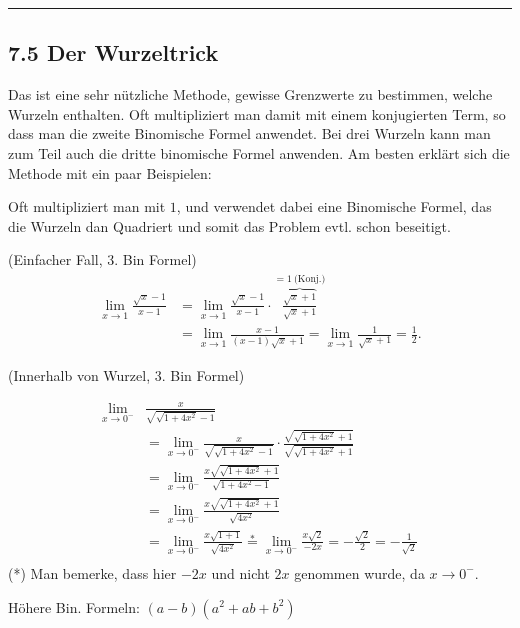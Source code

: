\documentclass[a4paper,landscape,8pt]{extarticle}
\newcommand{\sep}{\vspace{5pt}\noindent\hrule\vspace{5pt}}
\begin{document}
\begin{multicols*}{4}
\sep

\subsection{7.5 Der Wurzeltrick}

Das ist eine sehr nützliche Methode, gewisse Grenzwerte zu bestimmen, welche
Wurzeln enthalten. Oft multipliziert man damit mit einem konjugierten Term, so
dass man die zweite Binomische Formel anwendet. Bei drei Wurzeln kann man zum
Teil auch die dritte binomische Formel anwenden. Am besten erklärt sich die
Methode mit ein paar Beispielen:

\Vorgehen Oft multipliziert man mit $1$, und verwendet dabei eine Binomische
Formel, das die Wurzeln dan Quadriert und somit das Problem evtl. schon
beseitigt.

\begin{warmup}
\Bsp (Einfacher Fall, 3. Bin Formel)
\begin{align*}
\lim_{x\to 1}\frac{\sqrt{x}-1}{x-1} 
& =\lim_{x\to 1}\frac{\sqrt{x}-1}{x-1} \cdot
\overbrace{\frac{\sqrt{x}+1}{\sqrt{x}+1}}^{=1 \ \text{(Konj.)}}\\
&=\lim_{x\to 1}\frac{x-1}{(x-1)\sqrt{x}+1}=\lim_{x\to 1}\frac{1}{\sqrt{x}+1} =
\frac{1}{2}.
\end{align*}

\Bsp (Innerhalb von Wurzel, 3. Bin Formel)

\begin{align*}
\lim_{x\to 0^-} &\frac{x}{\sqrt{\sqrt{1+4x^2}-1}}\\
&= \lim_{x\to 0^-} \frac{x}{\sqrt{\sqrt{1+4x^2}-1}} \cdot
    \frac{\sqrt{\sqrt{1+4x^2}+1}}{\sqrt{\sqrt{1+4x^2}+1}}\\
&= \lim_{x\to 0^-} \frac{x\sqrt{\sqrt{1+4x^2}+1}}{\sqrt{1+4x^2-1}}\\
&= \lim_{x\to 0^-} \frac{x\sqrt{\sqrt{1+4x^2}+1}}{\sqrt{4x^2}}\\
&= \lim_{x\to 0^-} \frac{x\sqrt{1+1}}{\sqrt{4x^2}}
\stackrel{*}{=} \lim_{x\to 0^-} \frac{x\sqrt{2}}{-2x}
=-\frac{\sqrt{2}}{2}=-\frac{1}{\sqrt{2}}\\
\end{align*}
(*) Man bemerke, dass hier $-2x$ und nicht $2x$ genommen wurde, da $x\to0^-$.

\end{warmup}

\Bsp Höhere Bin. Formeln: $(a-b)(a^2+ab+b^2)$


\end{multicols*}
\end{document}
